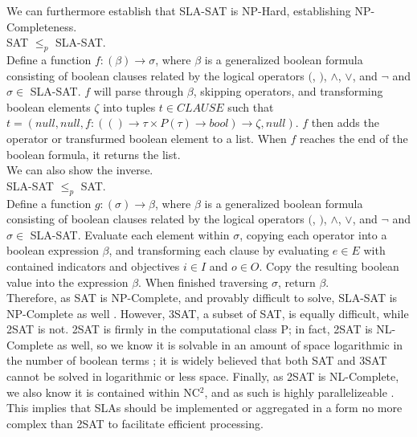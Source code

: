 \documentclass[a4paper,twoside]{article}
\begin{document}
\noindent We can furthermore establish that SLA-SAT is NP-Hard, establishing NP-Completeness.\\

 SAT $ \leq_{p} $ SLA-SAT.\\

 Define a function $ f : ( \beta ) \rightarrow \sigma $, where $ \beta $ is a generalized boolean formula consisting of boolean clauses related by the logical operators $($, $)$, $\land$, $\lor$, and $\lnot$ and $ \sigma \in $ SLA-SAT. $ f $ will parse through $ \beta $, skipping operators, and transforming boolean elements $ \zeta $ into tuples $ t \in CLAUSE $ such that $ t = ( null, null, f : ( () \rightarrow \tau \times P(\tau) \rightarrow bool ) \rightarrow \zeta, null ) $.  $ f $ then adds the operator or transfurmed boolean element to a list.  When $ f $ reaches the end of the boolean formula, it returns the list. \\

\noindent We can also show the inverse.\\

 SLA-SAT $ \leq_{p} $ SAT.\\

 Define a function $ g : ( \sigma ) \rightarrow \beta $, where $ \beta $ is a generalized boolean formula consisting of boolean clauses related by the logical operators $($, $)$, $\land$, $\lor$, and $\lnot$ and $ \sigma \in $ SLA-SAT.  Evaluate each element within $\sigma$, copying each operator into a boolean expression $\beta$, and transforming each clause by evaluating $e \in E$ with contained indicators and objectives $i \in I$ and $o \in O$.  Copy the resulting boolean value into the expression $\beta$.  When finished traversing $\sigma$, return $\beta$. \\

Therefore, as SAT is NP-Complete, and provably difficult to solve, SLA-SAT is NP-Complete as well \cite{comptheory:sipser:intro-comp-theory}.  However, 3SAT, a subset of SAT, is equally difficult, while 2SAT is not.  2SAT is firmly in the computational class P; in fact, 2SAT is NL-Complete as well, so we know it is solvable in an amount of space logarithmic in the number of boolean terms \cite{comptheory:papadimitriou:computational-complexity}; it is widely believed that both SAT and 3SAT cannot be solved in logarithmic or less space.  Finally, as 2SAT is NL-Complete, we also know it is contained within NC$^{2}$, and as such is highly parallelizeable \cite{comptheory:papadimitriou:computational-complexity}.  This implies that SLAs should be implemented or aggregated in a form no more complex than 2SAT to facilitate efficient processing.
\end{document}
